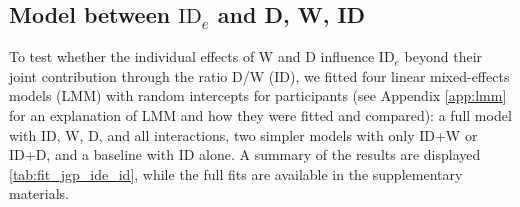 \documentclass[acmlarge, manuscript,review]{acmart}
\newcommand{\mt}{\ensuremath{{\text{MT}}}\xspace}
\newcommand{\ide}{\ensuremath{{\text{ID}_e}}\xspace}
\begin{document}



\subsection{Model between \ide and D, W, ID\label{sub:jgp_id}}
To test whether the individual effects of W and D influence \ide beyond their joint contribution through the ratio D/W (ID), we fitted four linear mixed-effects models (LMM) with random intercepts for participants (see Appendix \ref{app:lmm} for an explanation of LMM and how they were fitted and compared): a full model with ID, W, D, and all interactions, two simpler models with only ID+W or ID+D, and a baseline with ID alone.
A summary of the results are displayed \autoref{tab:fit_jgp_ide_id}, while the full fits are available in the supplementary materials.
\end{document}
